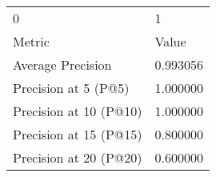 \begin{tabular}{ll}
0 & 1 \\
Metric & Value \\
Average Precision & 0.993056 \\
Precision at 5 (P@5) & 1.000000 \\
Precision at 10 (P@10) & 1.000000 \\
Precision at 15 (P@15) & 0.800000 \\
Precision at 20 (P@20) & 0.600000 \\
\end{tabular}
